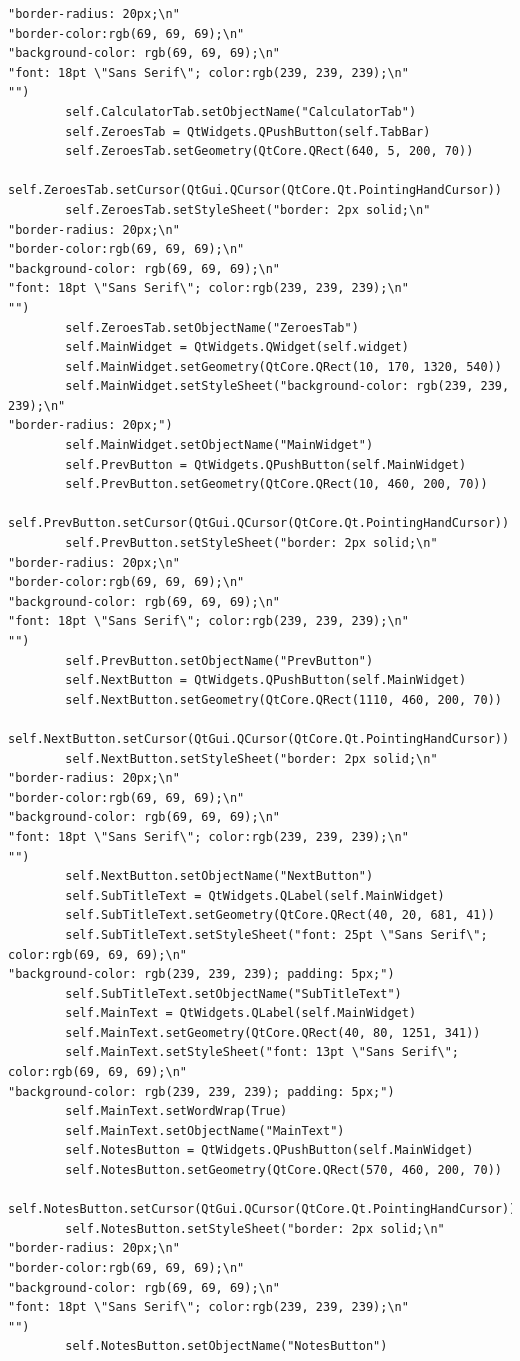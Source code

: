 \documentclass[12pt]{article}
\begin{document}
\begin{lstlisting}
"border-radius: 20px;\n"
"border-color:rgb(69, 69, 69);\n"
"background-color: rgb(69, 69, 69);\n"
"font: 18pt \"Sans Serif\"; color:rgb(239, 239, 239);\n"
"")
        self.CalculatorTab.setObjectName("CalculatorTab")
        self.ZeroesTab = QtWidgets.QPushButton(self.TabBar)
        self.ZeroesTab.setGeometry(QtCore.QRect(640, 5, 200, 70))
        self.ZeroesTab.setCursor(QtGui.QCursor(QtCore.Qt.PointingHandCursor))
        self.ZeroesTab.setStyleSheet("border: 2px solid;\n"
"border-radius: 20px;\n"
"border-color:rgb(69, 69, 69);\n"
"background-color: rgb(69, 69, 69);\n"
"font: 18pt \"Sans Serif\"; color:rgb(239, 239, 239);\n"
"")
        self.ZeroesTab.setObjectName("ZeroesTab")
        self.MainWidget = QtWidgets.QWidget(self.widget)
        self.MainWidget.setGeometry(QtCore.QRect(10, 170, 1320, 540))
        self.MainWidget.setStyleSheet("background-color: rgb(239, 239, 239);\n"
"border-radius: 20px;")
        self.MainWidget.setObjectName("MainWidget")
        self.PrevButton = QtWidgets.QPushButton(self.MainWidget)
        self.PrevButton.setGeometry(QtCore.QRect(10, 460, 200, 70))
        self.PrevButton.setCursor(QtGui.QCursor(QtCore.Qt.PointingHandCursor))
        self.PrevButton.setStyleSheet("border: 2px solid;\n"
"border-radius: 20px;\n"
"border-color:rgb(69, 69, 69);\n"
"background-color: rgb(69, 69, 69);\n"
"font: 18pt \"Sans Serif\"; color:rgb(239, 239, 239);\n"
"")
        self.PrevButton.setObjectName("PrevButton")
        self.NextButton = QtWidgets.QPushButton(self.MainWidget)
        self.NextButton.setGeometry(QtCore.QRect(1110, 460, 200, 70))
        self.NextButton.setCursor(QtGui.QCursor(QtCore.Qt.PointingHandCursor))
        self.NextButton.setStyleSheet("border: 2px solid;\n"
"border-radius: 20px;\n"
"border-color:rgb(69, 69, 69);\n"
"background-color: rgb(69, 69, 69);\n"
"font: 18pt \"Sans Serif\"; color:rgb(239, 239, 239);\n"
"")
        self.NextButton.setObjectName("NextButton")
        self.SubTitleText = QtWidgets.QLabel(self.MainWidget)
        self.SubTitleText.setGeometry(QtCore.QRect(40, 20, 681, 41))
        self.SubTitleText.setStyleSheet("font: 25pt \"Sans Serif\"; color:rgb(69, 69, 69);\n"
"background-color: rgb(239, 239, 239); padding: 5px;")
        self.SubTitleText.setObjectName("SubTitleText")
        self.MainText = QtWidgets.QLabel(self.MainWidget)
        self.MainText.setGeometry(QtCore.QRect(40, 80, 1251, 341))
        self.MainText.setStyleSheet("font: 13pt \"Sans Serif\"; color:rgb(69, 69, 69);\n"
"background-color: rgb(239, 239, 239); padding: 5px;")
        self.MainText.setWordWrap(True)
        self.MainText.setObjectName("MainText")
        self.NotesButton = QtWidgets.QPushButton(self.MainWidget)
        self.NotesButton.setGeometry(QtCore.QRect(570, 460, 200, 70))
        self.NotesButton.setCursor(QtGui.QCursor(QtCore.Qt.PointingHandCursor))
        self.NotesButton.setStyleSheet("border: 2px solid;\n"
"border-radius: 20px;\n"
"border-color:rgb(69, 69, 69);\n"
"background-color: rgb(69, 69, 69);\n"
"font: 18pt \"Sans Serif\"; color:rgb(239, 239, 239);\n"
"")
        self.NotesButton.setObjectName("NotesButton")


\end{lstlisting}
\end{document}
